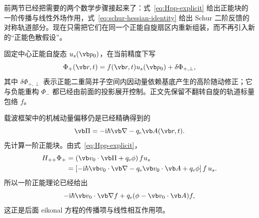 前两节已经把需要的两个数学步骤接起来了：式~\cref{eq:Hpp-explicit} 给出正能块的一阶传播与线性外场作用，式~\cref{eq:schur-hessian-identity} 给出 Schur 二阶反馈的对称轨道部分。现在只需把它们在同一个正能自旋扇区内重新组装，而不再引入新的“正能色散假设”。

固定中心正能自旋态 $u_s(\vb p_0)$，在当前精度下写
\begin{equation}
\Phi_+(\vb r,t)=f(\vb r,t)u_s(\vb p_0)+\delta\Phi_{+,\perp},
\label{eq:positive-envelope-decomposition}
\end{equation}
其中 $\delta\Phi_{+,\perp}$ 表示正能二重简并子空间内因动量依赖基底产生的高阶随动修正；它与负能重构 $\Phi_-$ 都已经由前面的投影展开控制。正文先保留不翻转自旋的轨道标量包络 $f$。

载波框架中的机械动量偏移仍是已经精确得到的
\begin{equation}
\vb\Pi=-\ii\hbar\vb\nabla-q_{\rm e}\vb A(\vb r,t).
\label{eq:relative-kinetic-momentum}
\end{equation}
先计算一阶正能块。由式~\cref{eq:Hpp-explicit}，
\begin{align}
H_{++}\Phi_+
&=\left(\vb v_0\cdot\vb\Pi+q_{\rm e}\phi\right)
 f u_s\\
&=\left[-\ii\hbar\vb v_0\cdot\vb\nabla
-q_{\rm e}\vb v_0\cdot\vb A+q_{\rm e}\phi\right]f\,u_s.
\label{eq:Hpp-on-envelope}
\end{align}
所以一阶正能理论已经给出
\begin{equation}
-\ii\hbar\vb v_0\cdot\vb\nabla f
+q_{\rm e}(\phi-\vb v_0\cdot\vb A)f,
\end{equation}
这正是后面 eikonal 方程的传播项与线性相互作用项。

